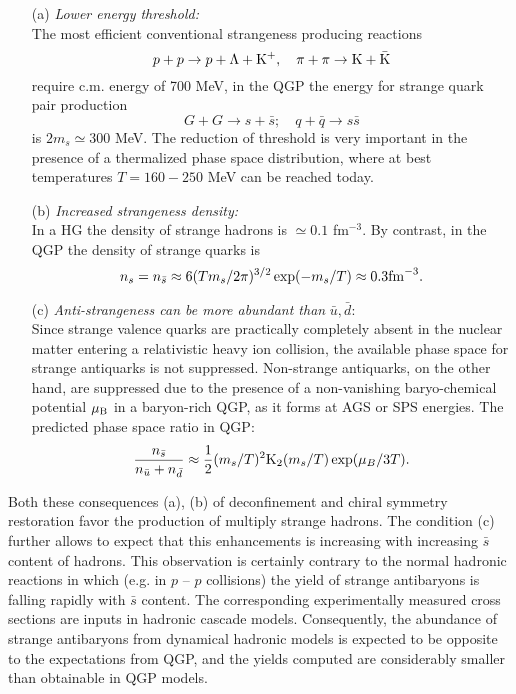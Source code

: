 \begin{mdframed}[linecolor=gray,roundcorner=12pt,backgroundcolor=Dandelion!15,linewidth=1pt,leftmargin=0cm,rightmargin=0cm,topline=true,bottomline=true,skipabove=12pt]
\begin{itemize}
\item[(a)] 
{\it Lower energy threshold:} \\
The most efficient conventional strangeness producing reactions\\[-0.3cm] 
$$p+p\to p +\Lambda+{\rm K}^+,\quad \pi+\pi\to{\rm K}+\bar{\rm K}$$
require c.m. energy of 700 MeV, in the QGP the energy for strange quark pair production\\[-0.6cm] 
$$G+G\to s+\bar s;\quad q+\bar q\to s\bar s$$
is $2m_{s}\simeq 300$ MeV. The reduction of threshold is very important in the presence of a thermalized phase space distribution, where at best temperatures $T = 160-250$ MeV can be reached today.
\item[(b)]
 {\it Increased strangeness density:} \\
In a HG the density of strange hadrons is $\simeq 0.1$ fm$^{-3}$. By contrast, in the QGP the density of strange quarks is\\[-0.3cm] 
\begin{equation}\nonumber
n_{s} = n_{\bar s} \approx 6(Tm_{s}/2\pi)^{3/2} \exp(-m_{s}/T) 
\approx 0.3 {\rm fm}^{-3} . 
\end{equation} 
\item[(c)]
 {\it Anti-strangeness can be more abundant than} $\bar u, \bar d$:\\
Since strange valence quarks are practically completely absent in the nuclear matter entering a relativistic heavy ion collision, the available phase space for strange antiquarks is not suppressed. Non-strange antiquarks, on the other hand, are suppressed due to the presence of a non-vanishing baryo-chemical potential $\mu_{\rm B}$ in a baryon-rich QGP, as it forms at AGS or SPS energies. The predicted phase space ratio in QGP:\\[-0.3cm] 
\begin{equation} \nonumber
\frac{n_{\bar s}}{n_{\bar u}+n_{\bar d}} \approx 
{1\over 2}(m_{s}/T)^2 {\rm K}_2(m_{s}/T) \exp(\mu_{B}/3T) . 
\end{equation} 
\end{itemize}
\indent Both these consequences (a), (b) of deconfinement and chiral symmetry restoration favor the production of multiply strange hadrons. The condition (c) further allows to expect that this enhancements is increasing with increasing $\bar s$ content of hadrons. This observation is certainly contrary to the normal hadronic reactions in which (e.g. in $p$ -- $p$ collisions) the yield of strange antibaryons is falling rapidly with $\bar s$ content. The corresponding experimentally measured cross sections are inputs in hadronic cascade models. Consequently, the abundance of strange antibaryons from dynamical hadronic models is expected to be opposite to the expectations from QGP, and the yields computed are considerably smaller than obtainable in QGP models.
\end{mdframed}
\vfill\eject

